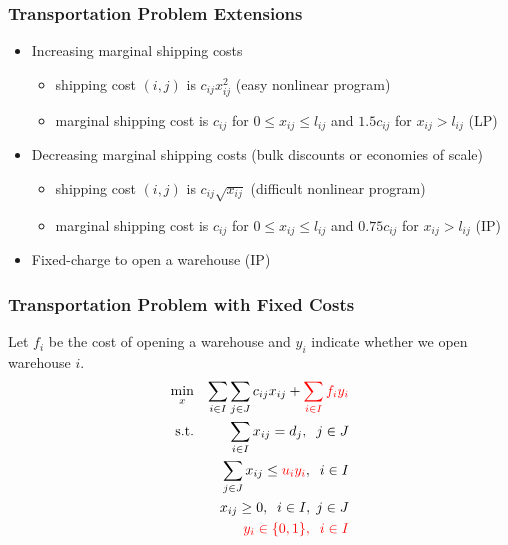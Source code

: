 \documentclass[12pt,handout]{beamer}
\begin{document}
\begin{frame}
\frametitle{Transportation Problem Extensions}
\begin{itemize}
\item Increasing marginal shipping costs
    \begin{itemize}
    \item shipping cost $(i,j)$ is $c_{ij} x_{ij}^2$ (easy nonlinear program)
    \item marginal shipping cost is $c_{ij}$ for $0 \le x_{ij} \le l_{ij}$ and $1.5c_{ij}$ for $x_{ij} > l_{ij}$ (LP)
    \end{itemize}
\item Decreasing marginal shipping costs (bulk discounts or economies of scale)
    \begin{itemize}
    \item shipping cost $(i,j)$ is $c_{ij} \sqrt{x_{ij}}$ (difficult nonlinear program)
    \item marginal shipping cost is $c_{ij}$ for $0 \le x_{ij} \le l_{ij}$ and $0.75c_{ij}$ for $x_{ij} > l_{ij}$ (IP)
    \end{itemize}
\item Fixed-charge to open a warehouse (IP)
\end{itemize}
\end{frame}

\begin{frame}
\frametitle{Transportation Problem with Fixed Costs}
Let $f_i$ be the cost of opening a warehouse and $y_i$ indicate whether we open warehouse $i$.
\begin{eqnarray}
\min_{x} && \sum_{i \in I} \sum_{j \in J} c_{ij} x_{ij} + {\color{red} \sum_{i \in I} f_i y_i} \nonumber \\
\mbox{s.t.} && \sum_{i \in I} x_{ij} = d_j,\;\;j \in J \nonumber \\
&& \sum_{j \in J} x_{ij} \le {\color{red} u_i y_i},\;\;i \in I \nonumber \\
&& x_{ij} \ge 0, \;\;i \in I,\;j \in J \nonumber \\
&& {\color{red} y_i \in \{0, 1\},\;\;i \in I} \nonumber
\end{eqnarray}
\end{frame}
\end{document}
